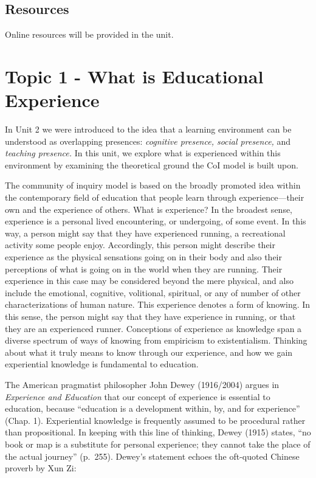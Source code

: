 \documentclass[
]{book}
\begin{document}
\hypertarget{resources-5}{%
\subsection*{Resources}\label{resources-5}}

Online resources will be provided in the unit.

\hypertarget{topic-1---what-is-educational-experience}{%
\section*{Topic 1 - What is Educational Experience}\label{topic-1---what-is-educational-experience}}

In Unit 2 we were introduced to the idea that a learning environment can be understood as overlapping presences: \emph{cognitive presence, social presence,} and \emph{teaching presence.} In this unit, we explore what is experienced within this environment by examining the theoretical ground the CoI model is built upon.

The community of inquiry model is based on the broadly promoted idea within the contemporary field of education that people learn through experience---their own and the experience of others. What is experience? In the broadest sense, experience is a personal lived encountering, or undergoing, of some event. In this way, a person might say that they have experienced running, a recreational activity some people enjoy. Accordingly, this person might describe their experience as the physical sensations going on in their body and also their perceptions of what is going on in the world when they are running. Their experience in this case may be considered beyond the mere physical, and also include the emotional, cognitive, volitional, spiritual, or any of number of other characterizations of human nature. This experience denotes a form of knowing. In this sense, the person might say that they have experience in running, or that they are an experienced runner. Conceptions of experience as knowledge span a diverse spectrum of ways of knowing from empiricism to existentialism. Thinking about what it truly means to know through our experience, and how we gain experiential knowledge is fundamental to education.

The American pragmatist philosopher John Dewey (1916/2004) argues in \emph{Experience and Education} that our concept of experience is essential to education, because ``education is a development within, by, and for experience'' (Chap. 1). Experiential knowledge is frequently assumed to be procedural rather than propositional. In keeping with this line of thinking, Dewey (1915) states, ``no book or map is a substitute for personal experience; they cannot take the place of the actual journey'' (p.~255). Dewey's statement echoes the oft-quoted Chinese proverb by Xun Zi:
\end{document}
